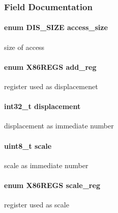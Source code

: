 \subsubsection{Field Documentation}
\hypertarget{struct_d_i_s__mem__arg_abe85ed51a3596cdb3a868a284c3d961f}{
\paragraph[{access\-\_\-size}]{\setlength{\rightskip}{0pt plus 5cm}enum {\bf D\-I\-S\-\_\-\-S\-I\-Z\-E} access\-\_\-size}}\label{struct_d_i_s__mem__arg_abe85ed51a3596cdb3a868a284c3d961f}
size of access \hypertarget{struct_d_i_s__mem__arg_abdbd08c3d265ff494ad5ff1006cc6a73}{
\paragraph[{add\-\_\-reg}]{\setlength{\rightskip}{0pt plus 5cm}enum {\bf X86\-R\-E\-G\-S} add\-\_\-reg}}\label{struct_d_i_s__mem__arg_abdbd08c3d265ff494ad5ff1006cc6a73}
register used as displacemenet \hypertarget{struct_d_i_s__mem__arg_a241d2c58aca95f8589148d4acf97406d}{
\paragraph[{displacement}]{\setlength{\rightskip}{0pt plus 5cm}int32\-\_\-t displacement}}\label{struct_d_i_s__mem__arg_a241d2c58aca95f8589148d4acf97406d}
displacement as immediate number \hypertarget{struct_d_i_s__mem__arg_a616c0a72f0e4af38b93c736773ac7210}{
\paragraph[{scale}]{\setlength{\rightskip}{0pt plus 5cm}uint8\-\_\-t scale}}\label{struct_d_i_s__mem__arg_a616c0a72f0e4af38b93c736773ac7210}
scale as immediate number \hypertarget{struct_d_i_s__mem__arg_afb3d2d6aee6f877fd62b8ffc576d9351}{
\paragraph[{scale\-\_\-reg}]{\setlength{\rightskip}{0pt plus 5cm}enum {\bf X86\-R\-E\-G\-S} scale\-\_\-reg}}\label{struct_d_i_s__mem__arg_afb3d2d6aee6f877fd62b8ffc576d9351}
register used as scale 